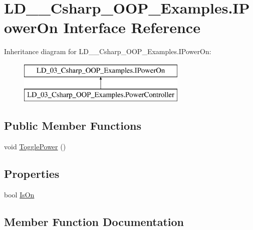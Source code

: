\hypertarget{interface_l_d__03___csharp___o_o_p___examples_1_1_i_power_on}{}\section{L\+D\+\_\+\_\+\+Csharp\+\_\+\+O\+O\+P\+\_\+\+Examples.\+I\+Power\+On Interface Reference}
\label{interface_l_d__03___csharp___o_o_p___examples_1_1_i_power_on}
Inheritance diagram for L\+D\+\_\+\_\+\+Csharp\+\_\+\+O\+O\+P\+\_\+\+Examples.\+I\+Power\+On\+:\begin{figure}[H]
\begin{center}
\leavevmode
\includegraphics[height=2.000000cm]{interface_l_d__03___csharp___o_o_p___examples_1_1_i_power_on}
\end{center}
\end{figure}
\subsection*{Public Member Functions}
\begin{DoxyCompactItemize}
\item 
void \mbox{\hyperlink{interface_l_d__03___csharp___o_o_p___examples_1_1_i_power_on_a6f71e842b3e94a5d6d690671197d0adc}{Toggle\+Power}} ()
\end{DoxyCompactItemize}
\subsection*{Properties}
\begin{DoxyCompactItemize}
\item 
bool \mbox{\hyperlink{interface_l_d__03___csharp___o_o_p___examples_1_1_i_power_on_ac1162237fd45586cb8f98e42a4778402}{Is\+On}}
\end{DoxyCompactItemize}


\subsection{Member Function Documentation}
\mbox{\label{interface_l_d__03___csharp___o_o_p___examples_1_1_i_power_on_a6f71e842b3e94a5d6d690671197d0adc}} 
